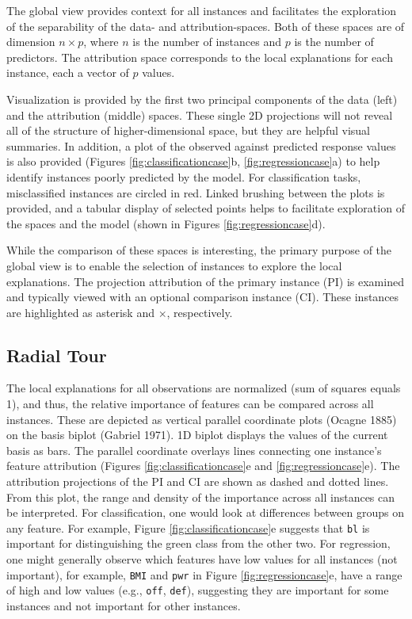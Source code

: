 \documentclass[11pt,twoside]{article}
\begin{document}
The global view provides context for all instances and facilitates the exploration of the separability of the data- and attribution-spaces. Both of these spaces are of dimension \(n\times p\), where \(n\) is the number of instances and \(p\) is the number of predictors. The attribution space corresponds to the local explanations for each instance, each a vector of \(p\) values.

Visualization is provided by the first two principal components of the data (left) and the attribution (middle) spaces. These single 2D projections will not reveal all of the structure of higher-dimensional space, but they are helpful visual summaries. In addition, a plot of the observed against predicted response values is also provided (Figures \ref{fig:classificationcase}b, \ref{fig:regressioncase}a) to help identify instances poorly predicted by the model. For classification tasks, misclassified instances are circled in red. Linked brushing between the plots is provided, and a tabular display of selected points helps to facilitate exploration of the spaces and the model (shown in Figures \ref{fig:regressioncase}d).

While the comparison of these spaces is interesting, the primary purpose of the global view is to enable the selection of instances to explore the local explanations. The projection attribution of the primary instance (PI) is examined and typically viewed with an optional comparison instance (CI). These instances are highlighted as asterisk and \(\times\), respectively.

\hypertarget{radial-tour}{%
\subsection{Radial Tour}\label{radial-tour}}

The local explanations for all observations are normalized (sum of squares equals 1), and thus, the relative importance of features can be compared across all instances. These are depicted as vertical parallel coordinate plots (Ocagne 1885) on the basis biplot (Gabriel 1971). 1D biplot displays the values of the current basis as bars. The parallel coordinate overlays lines connecting one instance's feature attribution (Figures \ref{fig:classificationcase}e and \ref{fig:regressioncase}e). The attribution projections of the PI and CI are shown as dashed and dotted lines. From this plot, the range and density of the importance across all instances can be interpreted. For classification, one would look at differences between groups on any feature. For example, Figure \ref{fig:classificationcase}e suggests that \texttt{bl} is important for distinguishing the green class from the other two. For regression, one might generally observe which features have low values for all instances (not important), for example, \texttt{BMI} and \texttt{pwr} in Figure \ref{fig:regressioncase}e, have a range of high and low values (e.g., \texttt{off}, \texttt{def}), suggesting they are important for some instances and not important for other instances.
\end{document}
